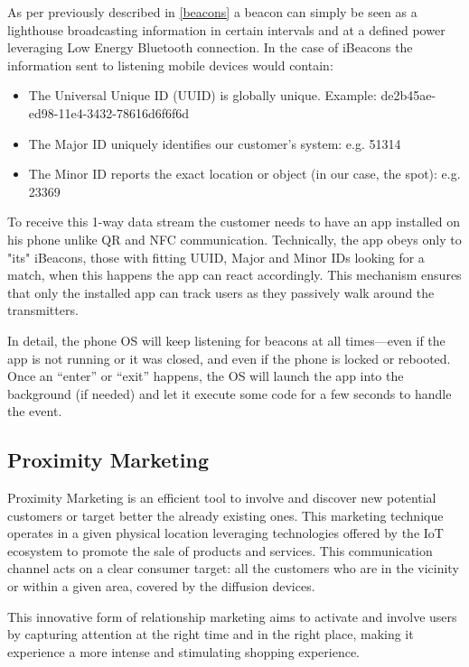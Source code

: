 As per previously described in \ref{beacons} a beacon can simply be seen as a lighthouse broadcasting information in certain intervals and at a defined power leveraging Low Energy Bluetooth connection. In the case of iBeacons the information sent to listening mobile devices would contain:


\begin{itemize}
  \item The Universal Unique ID (UUID) is globally unique. Example: de2b45ae-ed98-11e4-3432-78616d6f6f6d
  \item The Major ID uniquely identifies our customer’s system: e.g. 51314
  \item The Minor ID reports the exact location or object (in our case, the spot): e.g. 23369
\end{itemize}

To receive this 1-way data stream the customer needs to have an app installed on his phone unlike QR and NFC communication. Technically, the app obeys only to "its" iBeacons, those with fitting UUID, Major and Minor IDs looking for a match, when this happens the app can react accordingly. This mechanism ensures that only the installed app can track users as they passively walk around the transmitters. 

In detail, the phone OS will keep listening for beacons at all times—even if the app is not running or it was closed, and even if the phone is locked or rebooted. Once an “enter” or “exit” happens, the OS will launch the app into the background (if needed) and let it execute some code for a few seconds to handle the event.

\subsection{Proximity Marketing}

Proximity Marketing is an efficient tool to involve and discover new potential customers or target better the already existing ones. This marketing technique operates in a given physical location leveraging technologies offered by the IoT ecosystem to promote the sale of products and services.  This communication channel acts on a clear consumer target: all the customers who are in the vicinity or within a given area, covered by the diffusion devices.

This innovative form of relationship marketing aims to activate and involve users by capturing attention at the right time and in the right place, making it experience a more intense and stimulating shopping experience.

